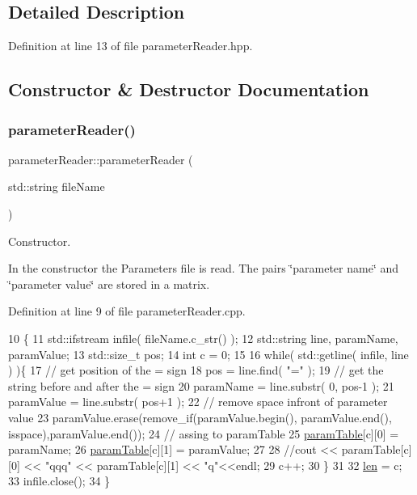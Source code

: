 \subsection{Detailed Description}


Definition at line 13 of file parameter\+Reader.\+hpp.



\subsection{Constructor \& Destructor Documentation}
\mbox{\label{classparameterReader_a179677148e67505aeba03b350b72d0d6}} 
\subsubsection{\texorpdfstring{parameter\+Reader()}{parameterReader()}}
{\footnotesize\ttfamily parameter\+Reader\+::parameter\+Reader (\begin{DoxyParamCaption}\item[{std\+::string}]{file\+Name }\end{DoxyParamCaption})}



Constructor. 

In the constructor the Parameters file is read. The pairs \char`\"{}parameter name\char`\"{} and \char`\"{}parameter value\char`\"{} are stored in a matrix. 

Definition at line 9 of file parameter\+Reader.\+cpp.


\begin{DoxyCode}
10 \{
11   std::ifstream infile( fileName.c\_str() );
12   std::string line, paramName, paramValue;
13   std::size\_t pos;
14   \textcolor{keywordtype}{int} c = 0;
15 
16   \textcolor{keywordflow}{while}( std::getline( infile, line ) )\{
17     \textcolor{comment}{// get position of the = sign}
18     pos = line.find( \textcolor{stringliteral}{"="} );
19     \textcolor{comment}{// get the string before and after the = sign}
20     paramName  = line.substr( 0, pos-1 );
21     paramValue = line.substr( pos+1 );
22     \textcolor{comment}{// remove space infront of parameter value}
23     paramValue.erase(remove\_if(paramValue.begin(), paramValue.end(), isspace),paramValue.end());
24     \textcolor{comment}{// assing to paramTable}
25     \hyperlink{classparameterReader_ac5b129418d06946c39462c2bf26aea54}{paramTable}[c][0] = paramName;
26     \hyperlink{classparameterReader_ac5b129418d06946c39462c2bf26aea54}{paramTable}[c][1] = paramValue;
27 
28     \textcolor{comment}{//cout << paramTable[c][0] << "qqq" << paramTable[c][1] << "q"<<endl;}
29     c++;
30   \}
31 
32   \hyperlink{classparameterReader_a72a2ac1e23e699b2f393193193d9dda7}{len} = c;
33   infile.close();
34 \}
\end{DoxyCode}


